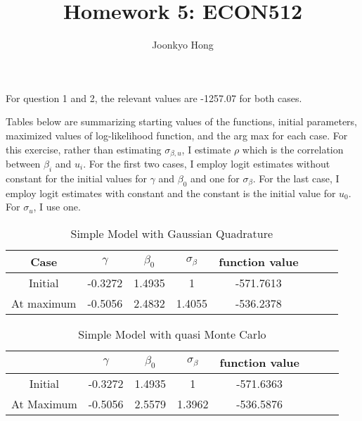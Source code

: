 \documentclass[10pt, letterpaper]{article}
\begin{document}
\title{Homework 5: ECON512}
\author{Joonkyo Hong}
\date{}
\maketitle
\smallskip

\noindent For question 1 and 2, the relevant values are -1257.07 for both cases.

\noindent Tables below are summarizing starting values of the functions, initial parameters, maximized values of log-likelihood function, and the arg max for each case. For this exercise, rather than estimating $\sigma_{\beta,u}$, I estimate $\rho$ which is the correlation between $\beta_{i}$ and $u_{i}$. For the first two cases, I employ logit estimates without constant for the initial values for $\gamma$ and $\beta_{0}$ and one for $\sigma_{\beta}$. For the last case, I employ logit estimates with constant and the constant is the initial value for $u_{0}$. For $\sigma_{u}$, I use one.

\begin{table}[h!]
  \begin{center}
    \caption{Simple Model with Gaussian Quadrature}  
    \label{tab:start}
    \begin{tabular}{c|cccccc|c} %
      \hline\hline
       Case        &$ \gamma  $&$  \beta_{0} $&$ \sigma_{\beta} $& function value\\
      \hline
       Initial     & -0.3272  &  1.4935      &      1            &    -571.7613 \\
       At maximum  & -0.5056  &  2.4832      &    1.4055         &    -536.2378 \\    
      \hline      \hline
    \end{tabular}
  \end{center}
\end{table} 

\begin{table}[h!]
  \begin{center}
    \caption{Simple Model with quasi Monte Carlo}  
    \label{tab:start}
    \begin{tabular}{c|cccccc|c} %
      \hline\hline
                     &$ \gamma  $&$  \beta_{0} $&$ \sigma_{\beta} $& function value\\
      \hline
       Initial     & -0.3272  &  1.4935        &    1            &    -571.6363 \\       
       At Maximum  & -0.5056  &  2.5579        &    1.3962       &    -536.5876  \\       
      \hline      \hline
    \end{tabular}
  \end{center}
\end{table} 
\end{document}
